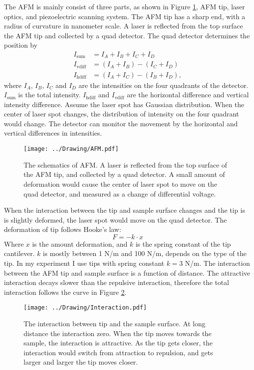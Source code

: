 \documentclass[pdftex, sectionletters]{pittetd}    %
\begin{document}
The AFM is mainly consist of three parts, as shown in Figure \ref{FIG:AFM}, AFM tip, laser optics, and piezoelectric scanning system. The AFM tip has a sharp end, with a radius of curvature in nanometer scale. A laser is reflected from the top surface the AFM tip and collected by a quad detector. The quad detector determines the position by
\begin{equation}
\begin{split}
I_\mathrm{sum} & = I_A + I_B + I_C + I_D \\ 
I_\mathrm{vdiff} & = (I_A + I_B) - (I_C + I_D) \\ 
I_\mathrm{hdiff} & = (I_A + I_C) - (I_B + I_D),
\end{split}
\end{equation}
where $I_A$, $I_B$, $I_C$ and $I_D$ are the intensities on the four quadrants of the detector. $I_\mathrm{sum}$ is the total intensity. $I_\mathrm{hdiff}$ and $I_\mathrm{vdiff}$ are the horizontal difference and vertical intensity difference. Assume the laser spot has Gaussian distribution. When the center of laser spot changes, the distribution of intensity on the four quadrant would change. The detector can monitor the movement by the horizontal and vertical differences in intensities. 

\begin{figure}[h]
	\centering
	\texttt{[image: ../Drawing/AFM.pdf]}
	\caption{The schematics of AFM. A laser is reflected from the top surface of the AFM tip, and collected by a quad detector. A small amount of deformation would cause the center of laser spot to move on the quad detector, and measured as a change of differential voltage.}
	\label{FIG:AFM}
\end{figure}

When the interaction between the tip and sample surface changes and the tip is is slightly deformed, the laser spot would move on the quad detector. The deformation of tip follows Hooke's law:
$$F = -k \cdot x$$
Where $x$ is the amount deformation, and $k$ is the spring constant of the tip cantilever. $k$ is mostly between 1 N/m and 100 N/m, depends on the type of the tip. In my experiment I use tips with spring constant $k = 3$ N/m. The interaction between the AFM tip and sample surface is a function of distance. The attractive interaction decays slower than the repulsive interaction, therefore the total interaction follows the curve in Figure \ref{FIG:Interaction}.

\begin{figure}[h!]
	\centering
	\texttt{[image: ../Drawing/Interaction.pdf]}
	\caption{The interaction between tip and the sample surface. At long distance the interaction zero. When the tip moves towards the sample, the interaction is attractive. As the tip gets closer, the interaction would switch from attraction to repulsion, and gets larger and larger the tip moves closer.}
	\label{FIG:Interaction}
\end{figure}
\end{document}
